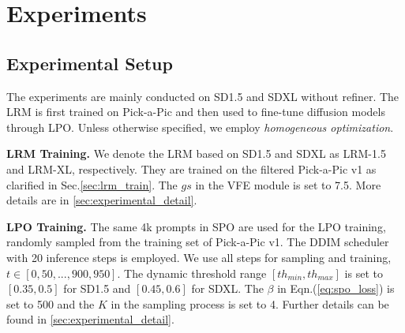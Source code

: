 \section{Experiments}
\label{sec:experiment}

\subsection{Experimental Setup}
\label{sec:exp_setup}
The experiments are mainly conducted on SD1.5 \cite{sd1} and SDXL \cite{sdxl} without refiner. The LRM is first trained on Pick-a-Pic and then used to fine-tune diffusion models through LPO. Unless otherwise specified, we employ \textit{homogeneous optimization}.

\textbf{LRM Training.} We denote the LRM based on SD1.5 and SDXL as LRM-1.5 and LRM-XL, respectively. They are trained on the filtered Pick-a-Pic v1 \cite{pickscore} as clarified in Sec.\;\ref{sec:lrm_train}. The $gs$ in the VFE module is set to 7.5. 
More details are in \cref{sec:experimental_detail}.

\textbf{LPO Training.} The same 4k prompts in SPO are used for the LPO training, randomly sampled from the training set of Pick-a-Pic v1. The DDIM scheduler \cite{ddim} with 20 inference steps is employed. We use all steps for sampling and training, \ie $t\in[0,50,...,900,950]$. The dynamic threshold range $[th_{min}, th_{max}]$ is set to $[0.35, 0.5]$ for SD1.5 and $[0.45, 0.6]$ for SDXL. The $\beta$ in Eqn.\;(\ref{eq:spo_loss}) is set to 500 and the $K$ in the sampling process is set to 4. Further details can be found in \cref{sec:experimental_detail}.

